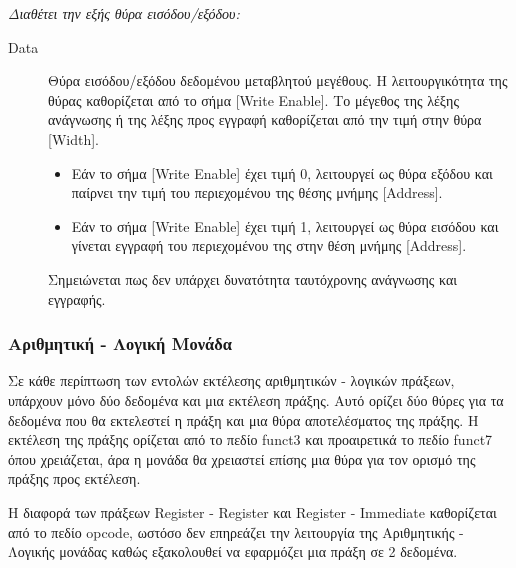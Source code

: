 \documentclass[11pt]{extarticle}
\begin{document}
\newpage
\textit{Διαθέτει την εξής θύρα εισόδου/εξόδου:}
\begin{description}
 \item[Data] Θύρα εισόδου/εξόδου δεδομένου μεταβλητού μεγέθους. \newline
 Η λειτουργικότητα της θύρας καθορίζεται από το σήμα [Write Enable]. 
 Το μέγεθος της λέξης ανάγνωσης ή της λέξης προς εγγραφή καθορίζεται από την τιμή στην θύρα [Width]. 
 \begin{itemize}
 \item Εάν το σήμα [Write Enable] έχει τιμή 0, λειτουργεί ως θύρα εξόδου και παίρνει την τιμή του περιεχομένου της θέσης μνήμης [Address].
 \item Εάν το σήμα [Write Enable] έχει τιμή 1, λειτουργεί ως θύρα εισόδου και γίνεται εγγραφή του περιεχομένου της στην θέση μνήμης [Address].
 \end{itemize}
 Σημειώνεται πως δεν υπάρχει δυνατότητα ταυτόχρονης ανάγνωσης και εγγραφής.
\end{description}

\subsubsection{Αριθμητική - Λογική Μονάδα}
Σε κάθε περίπτωση των εντολών εκτέλεσης αριθμητικών - λογικών πράξεων, υπάρχουν μόνο δύο δεδομένα και μια εκτέλεση πράξης.
Αυτό ορίζει δύο θύρες για τα δεδομένα που θα εκτελεστεί η πράξη και μια θύρα αποτελέσματος της πράξης.
Η εκτέλεση της πράξης ορίζεται από το πεδίο funct3 και προαιρετικά το πεδίο funct7 όπου χρειάζεται, άρα η μονάδα θα χρειαστεί επίσης μια θύρα για τον ορισμό της πράξης προς εκτέλεση.

Η διαφορά των πράξεων Register - Register και Register - Immediate καθορίζεται από το πεδίο opcode, ωστόσο δεν επηρεάζει την λειτουργία της Αριθμητικής - Λογικής μονάδας καθώς εξακολουθεί να εφαρμόζει μια πράξη σε 2 δεδομένα. \newline
\end{document}
